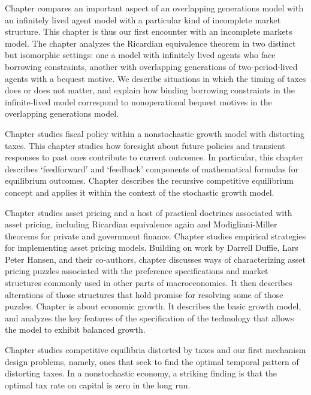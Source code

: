 Chapter  compares an important aspect
of an overlapping generations model with
an infinitely lived agent  model  with a particular
kind of incomplete market structure.  This chapter is thus
our first  encounter with an incomplete markets model.
The chapter analyzes the Ricardian equivalence  theorem in two distinct
but isomorphic settings:  one a model with infinitely lived
agents who face borrowing constraints, another with overlapping generations
of two-period-lived agents with a bequest motive.    We describe
situations in which the timing of taxes does or does not
matter, and explain how binding borrowing
constraints in the infinite-lived model correspond
to nonoperational bequest motives in the overlapping generations
model.

Chapter  studies fiscal policy within a nonstochastic growth model with
distorting taxes.  This chapter studies  how foresight about future policies and
transient responses to past ones contribute to current outcomes. In particular, this chapter describes
`feedforward' and `feedback' components of mathematical
\newpage
\noindent
 formulas  for equilibrium outcomes.
Chapter  describes the recursive competitive equilibrium concept and applies it within the context of
the stochastic growth model.

Chapter  studies asset pricing  and a host of practical
doctrines associated with asset pricing, including
Ricardian equivalence again and Modigliani-Miller theorems
for private and government finance. Chapter  studies empirical strategies
for implementing asset pricing models. Building on work by Darrell Duffie, Lars Peter Hansen,  and their co-authors,  chapter   discusses  ways of characterizing asset pricing puzzles
associated with the preference specifications and market structures commonly used in other parts of macroeconomics.
It then describes alterations of those structures that hold promise for  resolving some of those puzzles.
%
%
Chapter  is about economic growth.  It describes
the basic growth model, and analyzes the key features
of the  specification of  the technology that allows
the model to exhibit balanced growth.

 Chapter  studies competitive
equilibria distorted by taxes  and our first
mechanism design problems, namely,
ones that seek to find the optimal temporal pattern of
distorting taxes. In a nonstochastic economy, a
striking finding is that the optimal tax rate on capital
is zero in the long run.


